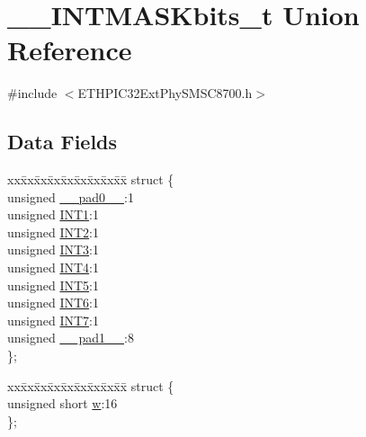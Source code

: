 \hypertarget{union_____i_n_t_m_a_s_kbits__t}{}\section{\+\_\+\+\_\+\+I\+N\+T\+M\+A\+S\+Kbits\+\_\+t Union Reference}
\label{union_____i_n_t_m_a_s_kbits__t}


{\ttfamily \#include $<$E\+T\+H\+P\+I\+C32\+Ext\+Phy\+S\+M\+S\+C8700.\+h$>$}

\subsection*{Data Fields}
\begin{DoxyCompactItemize}
\item 
\begin{tabbing}
xx\=xx\=xx\=xx\=xx\=xx\=xx\=xx\=xx\=\kill
struct \{\\
\>unsigned \hyperlink{union_____i_n_t_m_a_s_kbits__t_adf71f3d8410c1f1dbbc96680a92c49af}{\_\_pad0\_\_}:1\\
\>unsigned \hyperlink{union_____i_n_t_m_a_s_kbits__t_a47cc5a5beb081340f905482dc80e00d3}{INT1}:1\\
\>unsigned \hyperlink{union_____i_n_t_m_a_s_kbits__t_a701a787be03bde234890290d2a507f1d}{INT2}:1\\
\>unsigned \hyperlink{union_____i_n_t_m_a_s_kbits__t_a6c886eb45c0096c0d3bc37b05416b171}{INT3}:1\\
\>unsigned \hyperlink{union_____i_n_t_m_a_s_kbits__t_af8c7aac64c1dded6d4bab1e8d958bc19}{INT4}:1\\
\>unsigned \hyperlink{union_____i_n_t_m_a_s_kbits__t_a832ae44f354c9afd727f5ace181e439f}{INT5}:1\\
\>unsigned \hyperlink{union_____i_n_t_m_a_s_kbits__t_a32ed04340c8ad7c9e9615760fe9c56e9}{INT6}:1\\
\>unsigned \hyperlink{union_____i_n_t_m_a_s_kbits__t_ace3cce0f8bc2d246805ad9a8c00ea02e}{INT7}:1\\
\>unsigned \hyperlink{union_____i_n_t_m_a_s_kbits__t_acaf2d0924a107ec6e8d2e31febaf66f9}{\_\_pad1\_\_}:8\\
\}; \\

\end{tabbing}\item 
\begin{tabbing}
xx\=xx\=xx\=xx\=xx\=xx\=xx\=xx\=xx\=\kill
struct \{\\
\>unsigned short \hyperlink{union_____i_n_t_m_a_s_kbits__t_a160850a4684a3e82c2323033964f2e98}{w}:16\\
\}; \\


\end{tabbing}
\end{DoxyCompactItemize}
